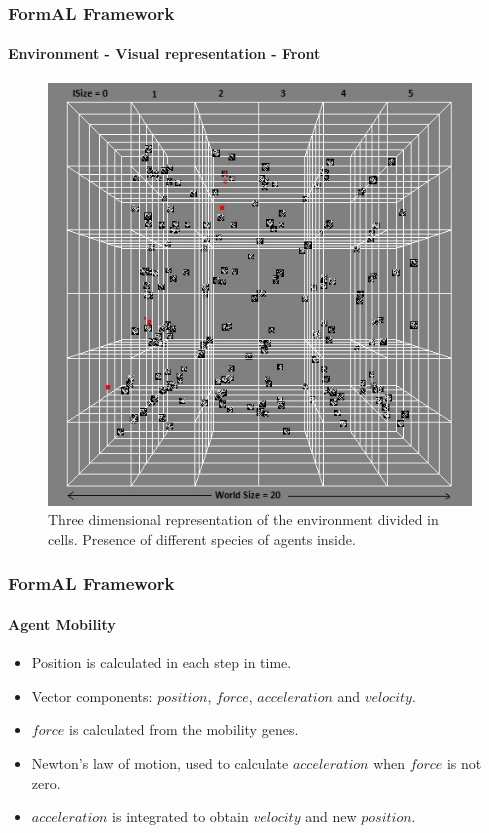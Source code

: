 \frame
{
	\frametitle{FormAL Framework}
	\framesubtitle{Environment - Visual representation - Front}

	\begin{figure}[H]
		\centering
		\includegraphics[scale=0.40]{../tex/images/cells-front}
		\caption{Three dimensional representation of the environment divided in cells. Presence of different species of agents inside.}
	\label{tab:3-d-environment-images-1}
	\end{figure}	
}

\frame
{
	\frametitle{FormAL Framework}
	\framesubtitle{Agent Mobility}
	
	\begin{itemize}
		\item Position is calculated in each step in time.
		\item Vector components: \(position\), \(force\), \(acceleration\) and \(velocity\).
		\item \(force\) is calculated from the mobility genes.
		\item Newton's law of motion, used to calculate \(acceleration\) when \(force\) is not zero.
		\item \(acceleration\) is integrated to obtain \(velocity\) and new \(position\).
	\end{itemize}

}

